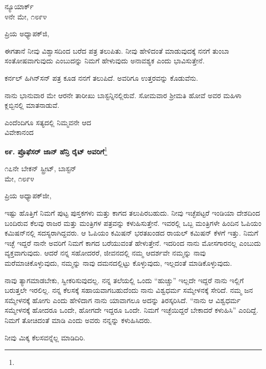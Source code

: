\begin{flushright}
ನ್ಯೂಯಾರ್ಕ್\\೪ನೇ ಮೇ, ೧೮೯೪
\end{flushright}

\noindent
ಪ್ರಿಯ ಅಧ್ಯಾಪಕ್‌ಜಿ,

ಈಗತಾನೆ ನೀವು ವಿಶ್ವಾಸದಿಂದ ಬರೆದ ಪತ್ರ ತಲುಪಿತು. ನೀವು ಹೇಳಿದಂತೆ ಮಾಡುವುದಕ್ಕೆ ನನಗೆ ತುಂಬಾ ಸಂತೋಷವಾಗುವುದು ಎಂಬುದನ್ನು ನಿಮಗೆ ಹೇಳುವುದು ಅನಾವಶ್ಯಕ ಎಂದು ಭಾವಿಸುತ್ತೇನೆ.

ಕರ್ನಲ್ ಹಿಗಿನ್‌ಸನ್ ಪತ್ರ ಕೂಡ ನನಗೆ ತಲುಪಿದೆ. ಅವರಿಗೂ ಉತ್ತರವನ್ನು ಕೊಡುವೆನು.

ನಾನು ಭಾನುವಾರ ಮೇ ಆರನೇ ತಾರೀಖು ಬಾಸ್ಟನ್ನಿನಲ್ಲಿರುವೆ. ಸೋಮವಾರ ಶ‍್ರೀಮತಿ ಹೋವೆ ಅವರ ಮಹಿಳಾ ಕ್ಲಬ್ಬಿನಲ್ಲಿ ಮಾತನಾಡುವೆ.

{\flushright
ಎಂದೆಂದಿಗೂ ಸತ್ಯದಲ್ಲಿ ನಿಮ್ಮವನೇ ಆದ\\ವಿವೇಕಾನಂದ\par}

\begin{center}
\textbf{೮೯. ಪ್ರೊಫೆಸರ್ ಜಾನ್ ಹೆನ್ರಿ ರೈಟ್ ಅವರಿಗೆ}\footnote{}
\end{center}

\begin{flushright}
೧೭ನೇ ಬೇಕನ್ ಸ್ಟ್ರೀಟ್, ಬಾಸ್ಟನ್\\ಮೇ, ೧೮೯೪
\end{flushright}

\noindent
ಪ್ರಿಯ ಅಧ್ಯಾಪಕ್‌ಜೀ,

ಇಷ್ಟು ಹೊತ್ತಿಗೆ ನಿಮಗೆ ಪುಟ್ಟ ಪುಸ್ತಕಗಳು ಮತ್ತು ಕಾಗದ ತಲುಪಿರಬಹುದು. ನೀವು ಇಚ್ಛೆಪಟ್ಟರೆ ಇಂಡಿಯಾ ದೇಶದಿಂದ ಬಂದಿರುವ ಕೆಲವು ರಾಜರ ಮತ್ತು ಮಂತ್ರಿಗಳ ಪತ್ರವನ್ನು ಕಳುಹಿಸುತ್ತೇನೆ. ಇವರಲ್ಲಿ ಒಬ್ಬ ಮಂತ್ರಿಗಳೇ ಹಿಂದಿನ ಓಪಿಯಂ ಕಮಿಷನ್‌ನಲ್ಲಿ ಸದಸ್ಯರಾಗಿದ್ದವರು. ಆ ಓಪಿಯಂ ಕಮಿಷನ್ ಭರತಖಂಡದ ರಾಯಲ್ ಕಮಿಷನ್ ಕೆಳಗೆ ಇತ್ತು. ನಿಮಗೆ ಇಚ್ಛೆ ಇದ್ದರೆ ನಾನೇ ಅವರಿಗೆ ನಿಮಗೆ ಕಾಗದ ಬರೆಯುವಂತೆ ಹೇಳುತ್ತೇನೆ. ಇದರಿಂದ ನಾನು ಮೋಸಗಾರನಲ್ಲ ಎಂಬುದು ವ್ಯಕ್ತವಾಗುವುದು. ಆದರೆ ನನ್ನ ಸಹೋದರರೆ, ಜೀವನದಲ್ಲಿ ನಮ್ಮ ಆದರ್ಶವೇ ನಮ್ಮನ್ನು ನಾವು ಮರೆಮಾಚಿಕೊಳ್ಳುವುದು, ನಮ್ಮನ್ನು ನಾವು ದಮನದಲ್ಲಿಟ್ಟು ಕೊಳ್ಳುವುದು, ಇಲ್ಲದಂತೆ ಮಾಡಿಕೊಳ್ಳುವುದು.

ನಾವು ತ್ಯಾಗಮಾಡಬೇಕು, ಸ್ವೀಕರಿಸುವುದಲ್ಲ. ನನ್ನ ತಲೆಯಲ್ಲಿ ಒಂದು ``ಹುಚ್ಚು” ಇಲ್ಲದೇ ಇದ್ದರೆ ನಾನು ಇಲ್ಲಿಗೆ ಬರುತ್ತಲೇ ಇರಲಿಲ್ಲ. ನನ್ನ ಕೆಲಸಕ್ಕೆ ಸಹಾಯವಾಗಬಹುದೆಂದು ನಾನು ವಿಶ್ವಧರ್ಮ ಸಮ್ಮೇಳನಕ್ಕೆ ಸೇರಿದೆ. ನಮ್ಮ ಜನ ಸಮ್ಮೇಳನಕ್ಕೆ ಹೋಗು ಎಂದು ಹೇಳಿದಾಗ ನಾನು ಯಾವಾಗಲೂ ಅದನ್ನು ತಿರಸ್ಕರಿಸಿದೆ. “ನಾನು ಆ ವಿಶ್ವಧರ್ಮ ಸಮ್ಮೇಳನಕ್ಕೆ ಹೋದರೂ ಒಂದೇ, ಹೋಗದೇ ಇದ್ದರೂ ಒಂದೇ. ನಿಮಗೆ ಇಚ್ಛೆಯಿದ್ದರೆ ಬೇಕಾದರೆ ಕಳುಹಿಸಿ'' ಎಂದಿದ್ದೆ. ನಿಮಗೆ ತೋಚಿದಂತೆ ಮಾಡಿ ಎಂದು ಅವರು ನನ್ನನ್ನು ಕಳುಹಿಸಿದರು.

\vspace{0.1cm}

ನೀವು ಮಿಕ್ಕ ಕೆಲಸವನ್ನೆಲ್ಲ ಮಾಡಿದಿರಿ.

